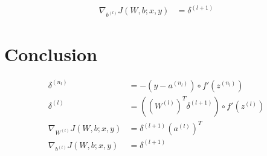 \documentclass{article}
\begin{document}
	\begin{equation}
		\begin{aligned}
			\nabla_{b^{(l)}} J(W, b; x, y) &= \delta^{(l+1)} 
		\end{aligned}
	\end{equation}
	
	\section{Conclusion}
	\begin{align}
		\delta^{(n_l)} &= - (y - a^{(n_l)}) \circ f'(z^{(n_l)}) \\
		\delta^{(l)} &= ((W^{(l)})^T \delta^{(l+1)}) \circ f'(z^{(l)}) \\
		\nabla_{W^{(l)}} J(W, b; x, y) &= \delta^{(l+1)}(a^{(l)})^T \\
		\nabla_{b^{(l)}} J(W, b; x, y) &= \delta^{(l+1)} 
	\end{align}
\end{document}
